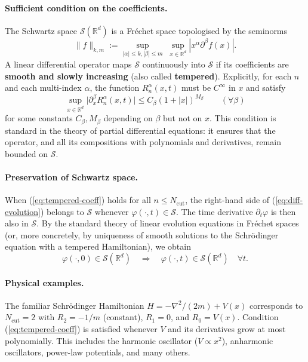 \documentclass{book}
\newcommand{\assign}{:=}
\newcommand{\tmop}[1]{\ensuremath{\operatorname{#1}}}
\newcommand{\tmstrong}[1]{\textbf{#1}}
\begin{document}
\paragraph{Sufficient condition on the coefficients.}
The Schwartz space $\mathcal{S} (\mathbb{R}^d)$ is a Fréchet space
topologised by the seminorms
\[ \| f \|_{k, m} \assign \sup_{|\alpha| \le k, |\beta| \le m} \;
   \sup_{x \in \mathbb{R}^d} | x^{\alpha} \partial^{\beta} f (x) | . \]
A linear differential operator maps $\mathcal{S}$ continuously into
$\mathcal{S}$ if its coefficients are {\tmstrong{smooth and slowly
increasing}} (also called {\tmstrong{tempered}}).  Explicitly, for each
$n$ and each multi-index $\alpha$, the function $R_n^{\alpha} (x, t)$ must
be $C^{\infty}$ in $x$ and satisfy
\begin{equation}
  \sup_{x \in \mathbb{R}^d} \bigl| \partial_x^{\beta} R_n^{\alpha} (x, t)
  \bigr| \le C_{\beta} (1 + |x|)^{M_{\beta}}
  \qquad (\forall \beta)
  \label{eq:tempered-coeff}
\end{equation}
for some constants $C_{\beta}, M_{\beta}$ depending on $\beta$ but not on
$x$.  This condition is standard in the theory of partial differential
equations: it ensures that the operator, and all its compositions with
polynomials and derivatives, remain bounded on $\mathcal{S}$.

\paragraph{Preservation of Schwartz space.}
When (\ref{eq:tempered-coeff}) holds for all $n \le N_{\tmop{cut}}$, the
right-hand side of (\ref{eq:diff-evolution}) belongs to $\mathcal{S}$
whenever $\varphi (\cdot, t) \in \mathcal{S}$.  The time derivative
$\partial_t \varphi$ is then also in $\mathcal{S}$.  By the standard theory
of linear evolution equations in Fréchet spaces (or, more concretely, by
uniqueness of smooth solutions to the Schrödinger equation with a tempered
Hamiltonian), we obtain
\[ \varphi (\cdot, 0) \in \mathcal{S} (\mathbb{R}^d)
   \quad\Longrightarrow\quad
   \varphi (\cdot, t) \in \mathcal{S} (\mathbb{R}^d) \quad \forall t . \]

\paragraph{Physical examples.}
The familiar Schrödinger Hamiltonian $H = - \nabla^2 / (2 m) + V (x)$
corresponds to $N_{\tmop{cut}} = 2$ with $R_2 = - 1 / m$ (constant),
$R_1 = 0$, and $R_0 = V (x)$.  Condition (\ref{eq:tempered-coeff}) is
satisfied whenever $V$ and its derivatives grow at most polynomially.
This includes the harmonic oscillator ($V \propto x^2$), anharmonic
oscillators, power-law potentials, and many others.
\end{document}
